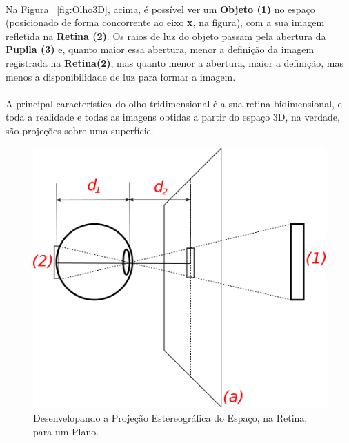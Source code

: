 \documentclass{article}
\begin{document}
	\paragraph{}
	Na Figura ~\ref{fig:Olho3D}, acima, é possível ver um  \textbf{Objeto (1)} no espaço (posicionado de forma concorrente ao eixo \textbf{x}, na figura), com a sua imagem refletida na \textbf{Retina (2)}. Os raios de luz do objeto passam pela abertura da \textbf{Pupila (3)} e, quanto maior essa abertura, menor a definição da imagem registrada na \textbf{Retina(2)}, mas quanto menor a abertura, maior a definição, mas menos a disponibilidade de luz para formar a imagem.
	
	\paragraph{}
	A principal característica do olho tridimensional é a sua retina bidimensional, e toda a realidade e todas as imagens obtidas a partir do espaço 3D, na verdade, são projeções sobre uma superfície.
	
	\begin{figure}[h]
		\centering
		\includegraphics[scale=0.7]{Desenvelope-Da-Retina}
		\caption{Desenvelopando a Projeção Estereográfica do Espaço, na Retina, para um Plano.}
		\label{fig:DesenvelopeRetina3D}
	\end{figure}
	
\end{document}
